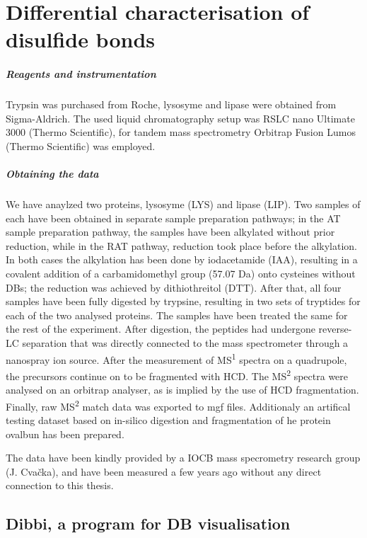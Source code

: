 \chapter{Differential characterisation of disulfide bonds}\label{chap:methods}

\paragraph{Reagents and instrumentation} Trypsin was purchased from Roche, lysosyme and lipase were obtained from Sigma-Aldrich. The used liquid chromatography setup was RSLC nano Ultimate 3000 (Thermo Scientific), for tandem mass spectrometry Orbitrap Fusion Lumos (Thermo Scientific) was employed.

\paragraph{Obtaining the data} We have anaylzed two proteins, lysosyme (LYS) and lipase (LIP). Two samples of each have been obtained in separate sample preparation pathways; in the AT sample preparation pathway, the samples have been alkylated without prior reduction, while in the RAT pathway, reduction took place before the alkylation. In both cases the alkylation has been done by iodacetamide (IAA), resulting in a covalent addition of a carbamidomethyl group (57.07 Da) onto cysteines without DBs; the reduction was achieved by dithiothreitol (DTT). After that, all four samples have been fully digested by trypsine, resulting in two sets of tryptides for each of the two analysed proteins. The samples have been treated the same for the rest of the experiment. After digestion, the peptides had undergone reverse-LC separation that was directly connected to the mass spectrometer through a nanospray ion source. After the measurement of MS\textsuperscript{1} spectra on a quadrupole, the precursors continue on to be fragmented with HCD\@. The MS\textsuperscript{2} spectra were analysed on an orbitrap analyser, as is implied by the use of HCD fragmentation. Finally, raw MS\textsuperscript{2} match data was exported to mgf files. Additionaly an artifical testing dataset based on in-silico digestion and fragmentation of he protein ovalbun has been prepared.

The data have been kindly provided by a IOCB mass specrometry research group (J. Cvačka), and have been measured a few years ago without any direct connection to this thesis.

\section{Dibbi, a program for DB visualisation}

